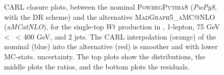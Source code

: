 \begin{figure}[!htbp]
    \centering
      \caption{CARL closure plots, between the nominal \textsc{Powheg}\textsc{Pythia}8 (\textit{PwPy8}, with the DR scheme) and the alternative \textsc{MadGraph5\_aMC@NLO} (\textit{aMCatNLO}), for the single-top $Wt$ production in \vhb, 1-lepton, 75 GeV < \ptv\ < 400 GeV, and 2 jets. The CARL interpolation (orange) of the nominal (blue) into the alternative (red) is smoother and with lower MC-stats. uncertainty. The top plots show the distributions, the middle plots the ratios, and the bottom plots the residuals.}
      \label{fig:carl:resolved_closure_stopWt}
  \end{figure}
  

